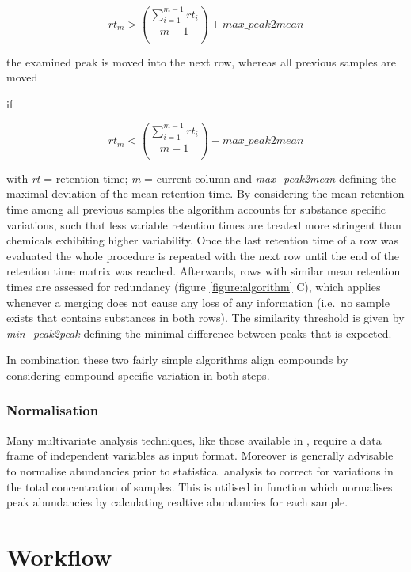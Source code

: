 \begin{equation}
rt_{m} > \left(\frac{\sum_{i=1}^{m-1}rt_{i}}{m-1}\right) + max{\_}peak2mean
\end{equation}

the examined peak is moved into the next row, whereas all previous
samples are moved \par
if

\begin{equation}
rt_{m} < \left(\frac{\sum_{i=1}^{m-1}rt_{i}}{m-1}\right) - max{\_}peak2mean
\end{equation}

with \textit{rt} = retention time; \textit{m} = current column and
\textit{max{\_}peak2mean} defining the maximal deviation of the mean
retention time. \newline By considering the mean retention time among
all previous samples the algorithm accounts for substance specific
variations, such that less variable retention times are treated more
stringent than chemicals exhibiting higher variability. Once the last
retention time of a row was evaluated the whole procedure is repeated
with the next row until the end of the retention time matrix was
reached. Afterwards, rows with similar mean retention times are assessed
for redundancy (figure \ref{figure:algorithm} C), which applies whenever
a merging does not cause any loss of any information (i.e.~no sample
exists that contains substances in both rows). The similarity threshold
is given by \textit{min{\_}peak2peak} defining the minimal difference
between peaks that is expected. \par In combination these two fairly
simple algorithms align compounds by considering compound-specific
variation in both steps.

\subsubsection{Normalisation}

Many multivariate analysis techniques, like those available in
, require a data frame of independent variables as input
format. Moreover is generally advisable to normalise abundancies prior
to statistical analysis to correct for variations in the total
concentration of samples. This is utilised in  function
 which normalises peak abundancies by calculating
realtive abundancies for each sample.

\section{Workflow}

